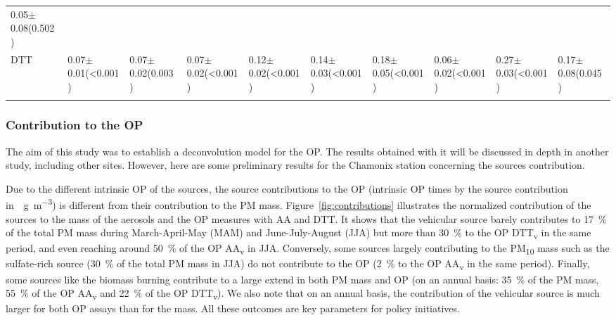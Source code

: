 \documentclass[acp, manuscript]{copernicus}
\begin{document}
\begin{table}
\begin{tabularx}{\textwidth}{lXXXXXXXXp{2.2cm}}
        0.05$\pm$0.08\newline (0.502)\\
        DTT & 
        0.07$\pm$0.01\newline (<0.001) & 0.07$\pm$0.02\newline (0.003) &
        0.07$\pm$0.02\newline (<0.001) & 0.12$\pm$0.02\newline (<0.001) &
        0.14$\pm$0.03\newline (<0.001) & 0.18$\pm$0.05\newline (<0.001) &
        0.06$\pm$0.02\newline (<0.001) & 0.27$\pm$0.03\newline (<0.001) & 
        0.17$\pm$0.08\newline (0.045)\\
        \bottomhline
    \end{tabularx}
    \label{tab:OPi}
\end{table}

\subsubsection{Contribution to the OP}\label{contribution-to-the-op}

The aim of this study was to establish a deconvolution model for the OP. The
results obtained with it will be discussed in depth in another study, including
other sites. However, here are some preliminary results for the Chamonix
station concerning the sources contribution.

Due to the different intrinsic OP of the sources, the source contributions to
the OP (intrinsic OP times by the source contribution in~\unit{\mu g~m^{-3}}) is
different from their contribution to the PM mass.
Figure~\ref{fig:contributions} illustrates the normalized contribution of the
sources to the mass of the aerosols and the OP measures with AA and DTT. It
shows that the vehicular source barely contributes to 17~\% of the total PM mass
during March-April-May (MAM) and June-July-August (JJA) but more than 30~\% to
the OP DTT\textsubscript{v} in the same period, and even reaching around 50~\%
of the OP AA\textsubscript{v} in JJA. Conversely, some sources largely
contributing to the PM\textsubscript{10} mass such as the sulfate-rich source
(30~\% of the total PM mass in JJA) do not contribute to the OP (2~\% to the OP
AA\textsubscript{v} in the same period). Finally, some sources like the biomass
burning contribute to a large extend in both PM mass and OP (on an annual basis:
35~\% of the PM mass, 55~\% of the OP AA\textsubscript{v} and 22~\% of the OP
DTT\textsubscript{v}). We also note that on an annual basis, the contribution of
the vehicular source is much larger for both OP assays than for the mass.  All
these outcomes are key parameters for policy initiatives.
\end{document}
